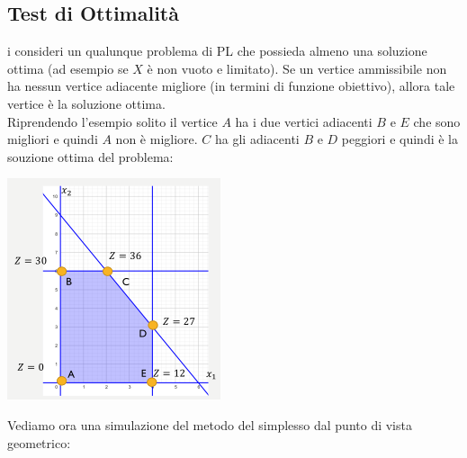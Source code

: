 \documentclass[a4paper,12pt, oneside]{book}
\begin{document}
\subsection{Test di Ottimalità}
i consideri un qualunque problema di PL che possieda almeno una
soluzione ottima (ad esempio se $X$ è non vuoto e limitato). Se un
vertice ammissibile non ha nessun vertice adiacente migliore
(in termini di funzione obiettivo), allora tale vertice è la soluzione
ottima.\\
Riprendendo l'esempio solito il vertice $A$ ha i due vertici adiacenti
$B$ e $E$ che sono migliori e quindi $A$ non è migliore. $C$ ha gli
adiacenti $B$ e $D$ peggiori e quindi è la souzione ottima del
problema:
\begin{center}
  \includegraphics[scale = 0.8]{img/simp7.png}
\end{center}
Vediamo ora una simulazione del metodo del simplesso dal punto di
vista geometrico:
\end{document}
